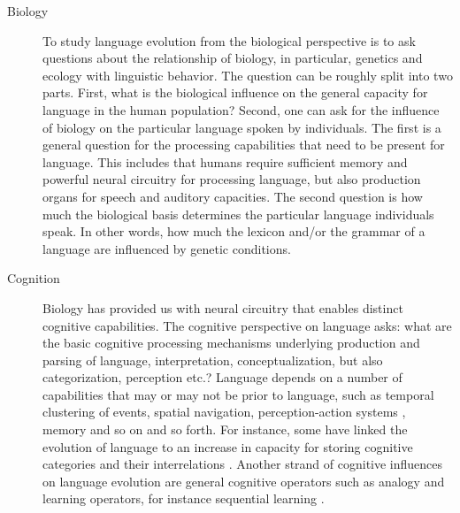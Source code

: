 \begin{description}
\item[Biology] To study language evolution from the biological
perspective is to ask questions about the relationship of biology,
in particular, genetics and ecology with linguistic behavior.
The question can be roughly split into two parts.
First, what is the biological influence on the general capacity for language
in the human population? Second, one can ask for the influence of biology on 
the particular language spoken by individuals. The first is a general question for 
the processing capabilities that need to be present for language.
This includes that humans require sufficient memory and powerful neural 
circuitry for processing language, but also production organs for speech 
and auditory capacities. The second question is how much the biological basis 
determines the particular language individuals speak. 
In other words, how much the lexicon and/or the grammar
of a language are influenced by genetic conditions. 

\item[Cognition] Biology has provided us with neural 
circuitry that enables distinct cognitive capabilities.
The cognitive perspective on language asks: what are the basic cognitive 
processing mechanisms underlying production and parsing of language, 
interpretation, conceptualization, but also categorization, perception
etc.? Language depends on a number of capabilities that may or may 
not be prior to language, such as temporal clustering 
of events, spatial navigation, perception-action systems 
\citep{rizzolatti1998language,arbib2002mirror,steels2012mirror,steels2008mirror},
memory and so on and so forth. For instance, some have linked the evolution 
of language to an increase in capacity for storing cognitive categories and 
their interrelations \citep{schoenemann1999syntax}. Another 
strand of cognitive influences on language evolution are general 
cognitive operators such as analogy and
learning operators, for instance sequential learning 
\citep{christiansen2001sequential}.


\end{description}
